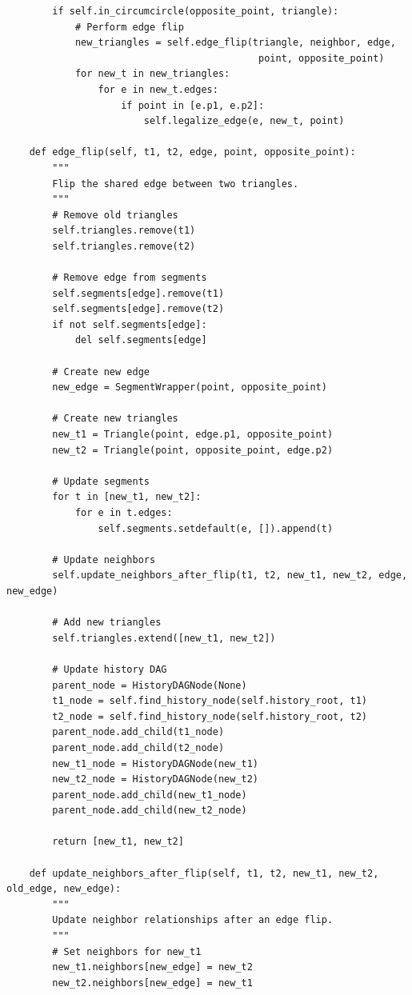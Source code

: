 \documentclass{article}
\begin{document}
\begin{verbatim}
        if self.in_circumcircle(opposite_point, triangle):
            # Perform edge flip
            new_triangles = self.edge_flip(triangle, neighbor, edge, 
                                            point, opposite_point)
            for new_t in new_triangles:
                for e in new_t.edges:
                    if point in [e.p1, e.p2]:
                        self.legalize_edge(e, new_t, point)

    def edge_flip(self, t1, t2, edge, point, opposite_point):
        """
        Flip the shared edge between two triangles.
        """
        # Remove old triangles
        self.triangles.remove(t1)
        self.triangles.remove(t2)

        # Remove edge from segments
        self.segments[edge].remove(t1)
        self.segments[edge].remove(t2)
        if not self.segments[edge]:
            del self.segments[edge]

        # Create new edge
        new_edge = SegmentWrapper(point, opposite_point)

        # Create new triangles
        new_t1 = Triangle(point, edge.p1, opposite_point)
        new_t2 = Triangle(point, opposite_point, edge.p2)

        # Update segments
        for t in [new_t1, new_t2]:
            for e in t.edges:
                self.segments.setdefault(e, []).append(t)

        # Update neighbors
        self.update_neighbors_after_flip(t1, t2, new_t1, new_t2, edge, new_edge)

        # Add new triangles
        self.triangles.extend([new_t1, new_t2])

        # Update history DAG
        parent_node = HistoryDAGNode(None)
        t1_node = self.find_history_node(self.history_root, t1)
        t2_node = self.find_history_node(self.history_root, t2)
        parent_node.add_child(t1_node)
        parent_node.add_child(t2_node)
        new_t1_node = HistoryDAGNode(new_t1)
        new_t2_node = HistoryDAGNode(new_t2)
        parent_node.add_child(new_t1_node)
        parent_node.add_child(new_t2_node)

        return [new_t1, new_t2]

    def update_neighbors_after_flip(self, t1, t2, new_t1, new_t2, old_edge, new_edge):
        """
        Update neighbor relationships after an edge flip.
        """
        # Set neighbors for new_t1
        new_t1.neighbors[new_edge] = new_t2
        new_t2.neighbors[new_edge] = new_t1


\end{verbatim}
\end{document}
